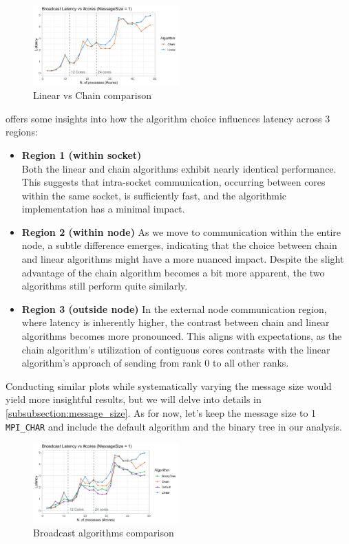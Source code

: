 \documentclass{article}
\begin{document}
\begin{figure}[htp]
    \centering
    \includegraphics[width=0.5\textwidth]{plots/linear_vs_chain.png}
    \caption{\footnotesize Linear vs Chain comparison}
    \label{plot:linear_vs_chain}
\end{figure}
 offers some insights into how the algorithm choice influences latency across 3 regions:
\begin{itemize}
    \item \textbf{Region 1 (within socket)}\\
    Both the linear and chain algorithms exhibit nearly identical performance. This suggests that intra-socket communication, occurring between cores within the same socket, is sufficiently fast, and the algorithmic implementation has a minimal impact.
    \item \textbf{Region 2 (within node)}
    As we move to communication within the entire node, a subtle difference emerges, indicating that the choice between chain and linear algorithms might have a more nuanced impact. Despite the slight advantage of the chain algorithm becomes a bit more apparent, the two algorithms still perform quite similarly.
    \item \textbf{Region 3 (outside node)}
    In the external node communication region, where latency is inherently higher, the contrast between chain and linear algorithms becomes more pronounced. This aligns with expectations, as the chain algorithm's utilization of contiguous cores contrasts with the linear algorithm's approach of sending from rank 0 to all other ranks.
\end{itemize}
Conducting similar plots while systematically varying the message size would yield more insightful results, but we will delve into details in \cref{subsubsection:message_size}. As for now, let's keep the message size to 1 \texttt{MPI\_CHAR} and include the default algorithm and the binary tree in our analysis.

\begin{figure}[htp]
    \centering
    \includegraphics[width=0.5\textwidth]{plots/algs_comparison.png}
    \caption{\footnotesize Broadcast algorithms comparison}
    \label{plot:algs_comparison}
\end{figure}
\end{document}
